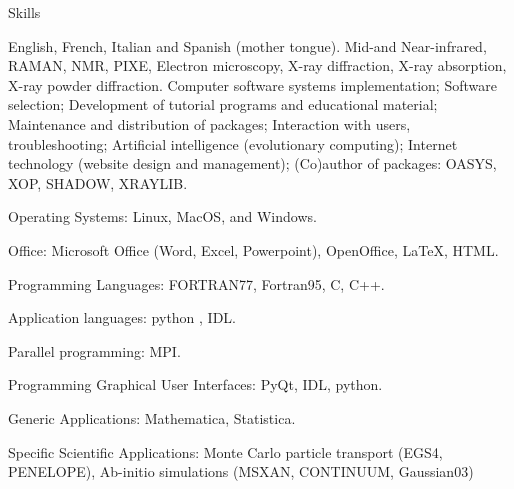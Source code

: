 \prefix{}
\begin{rubric}{Skills}


\entry*[Languages]
	English, French, Italian and Spanish (mother tongue).
	 Mid-and Near-infrared, RAMAN, NMR, PIXE, Electron microscopy, X-ray diffraction, X-ray absorption, X-ray powder diffraction.
Computer software systems implementation; Software selection; Development of tutorial programs and educational material; Maintenance and distribution of packages; Interaction with users, troubleshooting; Artificial intelligence (evolutionary computing); Internet technology (website design and management); (Co)author of packages: OASYS, XOP, SHADOW, XRAYLIB.


Operating Systems: Linux, MacOS, and Windows.

Office: Microsoft Office (Word, Excel, Powerpoint), OpenOffice, \LaTeX, HTML.  

Programming Languages: FORTRAN77, Fortran95, C, C++.

Application languages: python , IDL.

Parallel programming: MPI.

Programming Graphical User Interfaces: PyQt, IDL, python.

Generic Applications: Mathematica, Statistica.

Specific Scientific Applications: Monte Carlo particle transport (EGS4, PENELOPE), Ab-initio simulations (MSXAN, CONTINUUM, Gaussian03)

\end{rubric}
